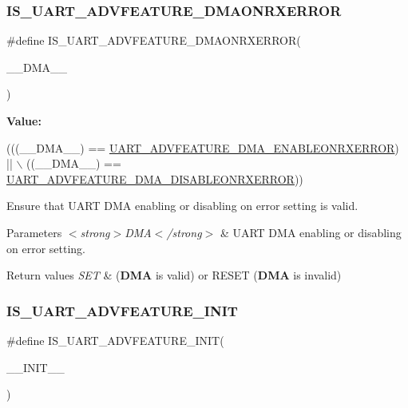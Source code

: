 \subsubsection{\texorpdfstring{I\+S\+\_\+\+U\+A\+R\+T\+\_\+\+A\+D\+V\+F\+E\+A\+T\+U\+R\+E\+\_\+\+D\+M\+A\+O\+N\+R\+X\+E\+R\+R\+OR}{IS\_UART\_ADVFEATURE\_DMAONRXERROR}}
{\footnotesize\ttfamily \#define I\+S\+\_\+\+U\+A\+R\+T\+\_\+\+A\+D\+V\+F\+E\+A\+T\+U\+R\+E\+\_\+\+D\+M\+A\+O\+N\+R\+X\+E\+R\+R\+OR(\begin{DoxyParamCaption}\item[{}]{\+\_\+\+\_\+\+D\+M\+A\+\_\+\+\_\+ }\end{DoxyParamCaption})}

{\bfseries Value\+:}
\begin{DoxyCode}
(((\_\_DMA\_\_) == \hyperlink{group___u_a_r_t___d_m_a___disable__on___rx___error_ga14469fd73075e481184234019a7b6734}{UART\_ADVFEATURE\_DMA\_ENABLEONRXERROR}) || \(\backslash\)
                                                   ((\_\_DMA\_\_) == 
      \hyperlink{group___u_a_r_t___d_m_a___disable__on___rx___error_gae838b9dfc0c2c082d5382973b369012b}{UART\_ADVFEATURE\_DMA\_DISABLEONRXERROR}))
\end{DoxyCode}


Ensure that U\+A\+RT D\+MA enabling or disabling on error setting is valid. 


\begin{DoxyParams}{Parameters}
{\em $<$strong$>$\+D\+M\+A$<$/strong$>$} & U\+A\+RT D\+MA enabling or disabling on error setting. \\
\hline
\end{DoxyParams}

\begin{DoxyRetVals}{Return values}
{\em S\+ET} & ({\bfseries D\+MA} is valid) or R\+E\+S\+ET ({\bfseries D\+MA} is invalid) \\
\hline
\end{DoxyRetVals}
\mbox{\label{group___u_a_r_t___private___macros_gad91bec43fbbaa25cec138ef8fcfbdad5}} 
\subsubsection{\texorpdfstring{I\+S\+\_\+\+U\+A\+R\+T\+\_\+\+A\+D\+V\+F\+E\+A\+T\+U\+R\+E\+\_\+\+I\+N\+IT}{IS\_UART\_ADVFEATURE\_INIT}}
{\footnotesize\ttfamily \#define I\+S\+\_\+\+U\+A\+R\+T\+\_\+\+A\+D\+V\+F\+E\+A\+T\+U\+R\+E\+\_\+\+I\+N\+IT(\begin{DoxyParamCaption}\item[{}]{\+\_\+\+\_\+\+I\+N\+I\+T\+\_\+\+\_\+ }\end{DoxyParamCaption})}

